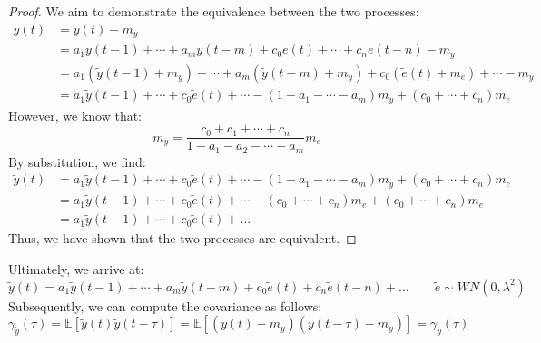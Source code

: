 \begin{proof}
    We aim to demonstrate the equivalence between the two processes:
    \begin{align*}
        \tilde{y}(t)    &= y(t)-m_y \\
                        &= a_1y(t-1)+\cdots+a_m y(t-m)+c_0e(t)+\cdots+c_n e(t-n) - m_y \\ 
                        &= a_1\left(\tilde{y}(t-1)+m_y\right)+\cdots+a_m\left(\tilde{y}(t-m)+m_y\right)+c_0\left(\tilde{e}(t)+m_e\right)+\cdots - m_y \\ 
                        &= a_1\tilde{y}(t-1) +\cdots +c_0\tilde{e}(t)+\cdots -\left(1 - a_1-\cdots-a_m\right)m_y+\left(c_0+\cdots+c_n\right)m_e   
    \end{align*}
    However, we know that:
    \[m_y =\dfrac{c_0 +c_1 +\cdots+c_n}{1-a_1-a_2-\cdots-a_m}m_e\]
    By substitution, we find:
    \begin{align*}
        \tilde{y}(t)    &= a_1\tilde{y}(t-1)  +\cdots +c_0\tilde{e}(t)+\cdots -\left(1 - a_1-\cdots-a_m\right)m_y+\left(c_0+\cdots+c_n\right)m_e \\ 
                        &= a_1\tilde{y}(t-1)  +\cdots +c_0\tilde{e}(t)+\cdots -\left(c_0 +\cdots+c_n\right)m_e+\left(c_0+\cdots+c_n\right)m_e \\ 
                        &= a_1\tilde{y}(t-1)  +\cdots +c_0\tilde{e}(t)+\dots     
    \end{align*}
    Thus, we have shown that the two processes are equivalent.
\end{proof}
Ultimately, we arrive at:
\[ \tilde{y}(t)=a_1\tilde{y}(t-1) +\cdots + a_m\tilde{y}(t-m)  +c_0\tilde{e}(t)+c_n\tilde{e}(t-n)+\dots  \qquad \tilde{e}\sim WN(0,\lambda^2)\]
Subsequently, we can compute the covariance as follows:
\[\gamma_{\tilde{y}}(\tau)=\mathbb{E}\left[ \tilde{y}(t)\tilde{y}(t-\tau) \right]=\mathbb{E}\left[ \left(y(t)-m_y\right)\left(y(t-\tau)-m_y\right) \right] =\gamma_y(\tau)\]